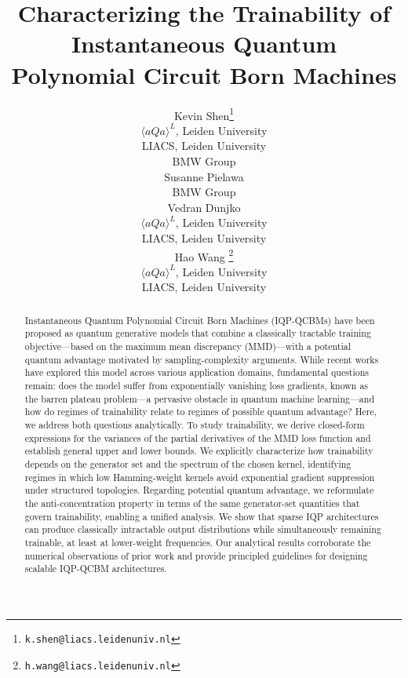 \documentclass{article}
\title{Characterizing the Trainability of Instantaneous Quantum Polynomial Circuit Born Machines}
\author{%
  Kevin Shen\thanks{\texttt{k.shen@liacs.leidenuniv.nl}} \\
  $\langle aQa \rangle ^L$, Leiden University\\
  LIACS, Leiden University\\
  BMW Group\\
  \And
  Susanne Pielawa\\
  BMW Group\\
  \AND
  Vedran Dunjko\\
  $\langle aQa \rangle ^L$, Leiden University\\
  LIACS, Leiden University\\
  \And
  Hao Wang \thanks{\texttt{h.wang@liacs.leidenuniv.nl}}\\
  $\langle aQa \rangle ^L$, Leiden University\\
  LIACS, Leiden University\\
}
\theoremstyle{plain}
\theoremstyle{definition}
\theoremstyle{remark}
\begin{document}
\maketitle


\begin{abstract}
Instantaneous Quantum Polynomial Circuit Born Machines (IQP-QCBMs) have been proposed as quantum generative models that combine a classically tractable training objective—based on the maximum mean discrepancy (MMD)—with a potential quantum advantage motivated by sampling-complexity arguments. While recent works have explored this model across various application domains, fundamental questions remain: does the model suffer from exponentially vanishing loss gradients, known as the barren plateau problem—a pervasive obstacle in quantum machine learning—and how do regimes of trainability relate to regimes of possible quantum advantage? Here, we address both questions analytically. To study trainability, we derive closed-form expressions for the variances of the partial derivatives of the MMD loss function and establish general upper and lower bounds. We explicitly characterize how trainability depends on the generator set and the spectrum of the chosen kernel, identifying regimes in which low Hamming-weight kernels avoid exponential gradient suppression under structured topologies. Regarding potential quantum advantage, we reformulate the anti-concentration property in terms of the same generator-set quantities that govern trainability, enabling a unified analysis. We show that sparse IQP architectures can produce classically intractable output distributions while simultaneously remaining trainable, at least at lower-weight frequencies. Our analytical results corroborate the numerical observations of prior work and provide principled guidelines for designing scalable IQP-QCBM architectures.
\end{abstract}
\end{document}
